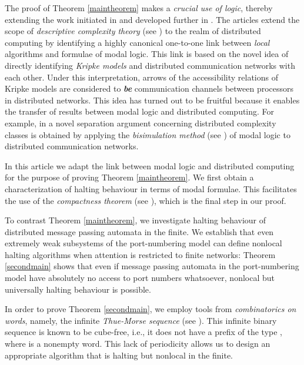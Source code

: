 \documentclass[copyright,creativecommons]{eptcs}
\begin{document}
The proof of Theorem \ref{maintheorem} makes a \emph{crucial use of logic},
thereby extending the work initiated in \cite{hella, hella2}
and developed further in \cite{kuusi}.
The articles \cite{hella, hella2, kuusi} extend the scope of \emph{descriptive complexity theory}
(see \cite{ebbinghaus, Immerman, libkin}) to the realm of distributed computing by identifying a
highly canonical one-to-one link between \emph{local} algorithms and
formulae of modal logic.
This link is based on the novel idea of 
directly identifying \emph{Kripke models}
and distributed communication networks with each other.
Under this interpretation, arrows of the accessibility relations of
Kripke models are considered to \emph{\textbf{be}} communication channels
between processors in distributed networks.
This idea has turned out to be fruitful because it enables the
transfer of results between modal logic and distributed computing.
For example, in \cite{hella, hella2} a novel separation argument
concerning distributed complexity classes is obtained by applying the
\emph{bisimulation method} (see \cite{johan, han, blackburn}) of modal logic to
distributed communication networks.




In this article we adapt the link between modal logic
and distributed computing for the purpose of
proving Theorem \ref{maintheorem}\hspace{0.4mm}.
We first obtain a characterization of 
halting behaviour in terms of modal formulae.
This facilitates the use of the \emph{compactness theorem} (see \cite{ebbinghaus}),
which is the final step in our  proof.




To contrast Theorem \ref{maintheorem}\hspace{0.4mm}, we investigate halting
behaviour of distributed message passing automata in the finite.
We establish that even extremely weak subsystems of the port-numbering model
can define nonlocal halting algorithms when attention is restricted to
finite networks:
Theorem \ref{secondmain} shows that even if message passing automata in the port-numbering
model have absolutely no access to port numbers whatsoever,
nonlocal but universally halting behaviour is possible.


In order to prove Theorem \ref{secondmain}\hspace{0.4mm}, we employ tools from
\emph{combinatorics on words}, namely, the 
infinite \emph{Thue-Morse sequence} (see \cite{allouche}). This infinite binary sequence is known to be cube-free,
i.e., it does not have a prefix of the type , where  is a nonempty word. This 
lack of periodicity allows us to design an appropriate algorithm that is halting but nonlocal
in the finite.
\end{document}
